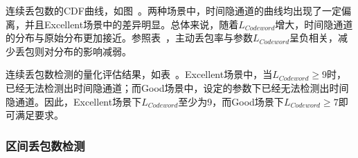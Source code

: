 连续丢包数的CDF曲线，如图\ 。两种场景中，时间隐通道的曲线均出现了一定偏离，并且Excellent场景中的差异明显。总体来说，随着$L_{Codeword}$增大，时间隐通道的分布与原始分布更加接近。参照表\ ，主动丢包率与参数$L_{Codeword}$呈负相关，减少丢包则对分布的影响减弱。

连续丢包数检测的量化评估结果，如表\ 。Excellent场景中，当$L_{Codeword}\ge 9$时，已经无法检测出时间隐通道；而Good场景中，设定的参数下已经无法检测出时间隐通道。因此，Excellent场景下$L_{Codeword}$至少为9，而Good场景下$L_{Codeword}\ge 7$即可满足要求。

\subsubsection{区间丢包数检测}
\label{chap:zigzag:results:undetectability:win}

